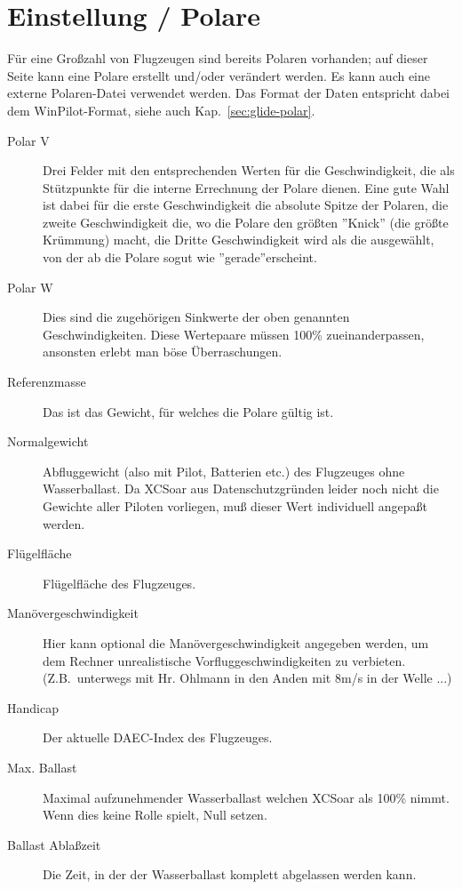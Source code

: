 \section{Einstellung / Polare}

Für eine Großzahl von Flugzeugen sind bereits Polaren vorhanden; auf dieser Seite kann eine
Polare erstellt und/oder verändert werden. Es kann auch eine externe Polaren-Datei verwendet werden.
Das Format der Daten entspricht dabei dem WinPilot-Format, siehe auch Kap.~\ref{sec:glide-polar}.
\label{conf:polar}

\begin{description}
\item[Polar V] Drei Felder mit den entsprechenden Werten für die Geschwindigkeit, die als Stützpunkte für die interne Errechnung der Polare dienen.
Eine gute Wahl ist dabei für die erste Geschwindigkeit die absolute Spitze der Polaren, die zweite Geschwindigkeit die, wo die Polare den größten ''Knick'' (die größte Krümmung) macht, die Dritte Geschwindigkeit wird als die ausgewählt, von der ab die Polare sogut wie ''gerade''erscheint.
\item[Polar W] Dies sind die zugehörigen Sinkwerte der oben genannten Geschwindigkeiten. Diese Wertepaare  müssen 100\% zueinanderpassen, ansonsten erlebt man böse Überraschungen.
\item[Referenzmasse] Das ist das Gewicht, für welches die Polare gültig ist.
\item[Normalgewicht] Abfluggewicht (also mit Pilot, Batterien etc.) des Flugzeuges ohne Wasserballast.
Da \textsf{XCSoar} aus Datenschutzgründen leider noch nicht die Gewichte aller Piloten vorliegen, muß dieser Wert individuell angepaßt werden.
\item[Flügelfläche]  Flügelfläche des Flugzeuges.
\item[Manövergeschwindigkeit] Hier kann optional die Manövergeschwindigkeit angegeben werden, um dem Rechner unrealistische Vorfluggeschwindigkeiten zu verbieten.
(Z.B.\ unterwegs mit Hr. Ohlmann in den Anden mit 8m/s in der Welle ...)
\item[Handicap]  Der aktuelle DAEC-Index des Flugzeuges.
\item[Max. Ballast] Maximal aufzunehmender Wasserballast welchen \textsf{XCSoar} als 100\% nimmt.
Wenn dies keine Rolle spielt,  Null setzen.
\item[Ballast Ablaßzeit]  Die Zeit, in der der Wasserballast komplett abgelassen werden kann.
\end{description}
